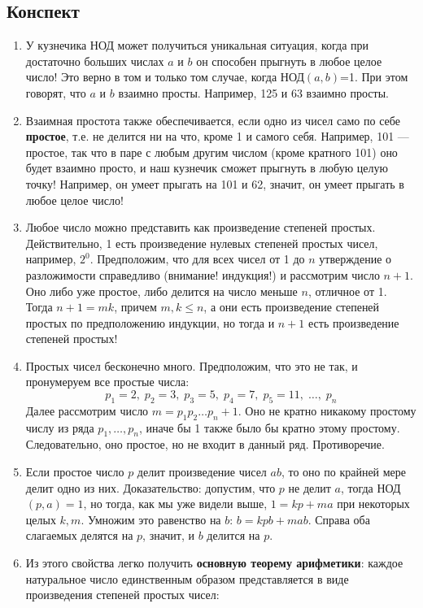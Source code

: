 \subsection*{Конспект}
\begin{enumerate}\setlength{\itemsep}{1pt}
\item У кузнечика НОД может получиться уникальная ситуация, когда при достаточно больших числах $a$ и $b$ он способен прыгнуть в любое целое число! Это верно в том и только том случае, когда НОД$(a,b)$=1. При этом говорят, что $a$ и $b$ взаимно просты. Например, 125 и 63 взаимно просты.
\item Взаимная простота также обеспечивается, если одно из чисел само по себе \textbf{простое}, т.е. не делится ни на что, кроме 1 и самого себя. Например, 101 --- простое, так что в паре с любым другим числом (кроме кратного 101) оно будет взаимно просто, и наш кузнечик сможет прыгнуть в любую целую точку! Например, он умеет прыгать на 101 и 62, значит, он умеет прыгать в любое целое число!
\item Любое число можно представить как произведение степеней простых. Действительно, 1 есть произведение нулевых степеней простых чисел, например, $2^0$. Предположим, что для всех чисел от 1 до $n$ утверждение о разложимости справедливо (внимание! индукция!) и рассмотрим число $n+1$. Оно либо уже простое, либо делится на число меньше $n$, отличное от 1. Тогда $n+1=mk$, причем $m,k\le n$, а они есть произведение степеней простых по предположению индукции, но тогда и $n+1$ есть произведение степеней простых!
\item Простых чисел бесконечно много. Предположим, что это не так, и пронумеруем все простые числа:
$$
p_1=2,\;p_2=3,\;p_3=5,\;p_4=7,\;p_5=11,\;\dots,\;p_n
$$
Далее рассмотрим число $m=p_1p_2\dots p_n+1$. Оно не кратно никакому простому числу из ряда $p_1,\dots,p_n$, иначе бы 1 также было бы кратно этому простому. Следовательно, оно простое, но не входит в данный ряд. Противоречие.
\item Если простое число $p$ делит произведение чисел $ab$, то оно по крайней мере делит одно из них. Доказательство: допустим, что $p$ не делит $a$, тогда НОД$(p,a)=1$, но тогда, как мы уже видели выше, $1=kp+ma$ при некоторых целых $k,m$. Умножим это равенство на $b$: $b=kpb+mab$. Справа оба слагаемых делятся на $p$, значит, и $b$ делится на $p$.
\item Из этого свойства легко получить \textbf{основную теорему арифметики}: каждое натуральное число единственным образом представляется в виде произведения степеней простых чисел:

\end{enumerate}
